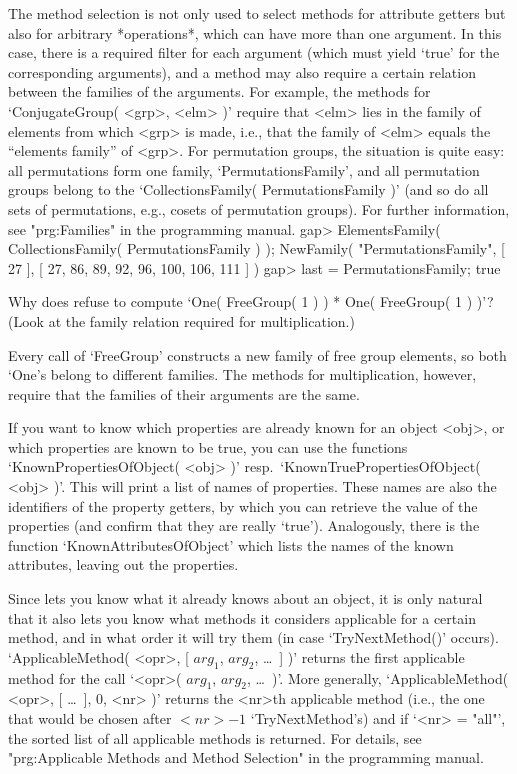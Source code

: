 %
The method selection  is not only  used to  select  methods for attribute
getters but also for arbitrary *operations*, which can have more than one
argument.  In this case,   there is a   required filter for each argument
(which must yield `true'  for the corresponding  arguments), and a method
may  also  require  a certain   relation   between the families  of   the
arguments. For example, the methods for  `ConjugateGroup( <grp>, <elm> )'
require that <elm>  lies in the family   of elements from  which <grp> is
made, i.e., that  the family of  <elm> equals the ``elements family''  of
<grp>.   For  permutation groups,  the  situation   is   quite easy:  all
permutations form  one family, `PermutationsFamily', and  all permutation
groups belong to the `CollectionsFamily( PermutationsFamily )' (and so do
all    sets of permutations, e.g.,     cosets of permutation groups). For
further information, see "prg:Families" in the programming manual.
\beginexample
    gap> ElementsFamily( CollectionsFamily( PermutationsFamily ) );
    NewFamily( "PermutationsFamily", [ 27 ],
               [ 27, 86, 89, 92, 96, 100, 106, 111 ] )
    gap> last = PermutationsFamily;
    true
\endexample

\exercise Why does {\GAP} refuse to compute `One( FreeGroup( 1 ) ) * One(
FreeGroup(  1   )   )'? (Look   at  the   family   relation  required for
multiplication.)

\answer Every call of  `FreeGroup' constructs a new  family of free group
elements, so both `One's belong   to different families. The methods  for
multiplication, however, require that the families of their arguments are
the same.

%
%
If  you want to know   which properties are   already known for an object
<obj>,  or  which properties  are  known  to  be true,   you can use  the
functions        `KnownPropertiesOfObject(     <obj>    )'         resp.\
`KnownTruePropertiesOfObject( <obj> )'. This will  print a list of  names
of  properties.  These names are  also   the identifiers  of the property
getters, by which  you can  retrieve  the value  of  the properties  (and
confirm that they are really `true').  Analogously, there is the function
`KnownAttributesOfObject' which lists the names  of the known attributes,
leaving out the properties.

%
Since {\GAP} lets you  know what it already  knows about an object, it is
only natural  that   it also  lets   you know what  methods  it considers
applicable for a certain method, and in  what order it  will try them (in
case `TryNextMethod()'  occurs).   `ApplicableMethod( <opr>, [   $arg_1$,
$arg_2$, \dots\ ]  )' returns the  first  applicable method for the  call
`<opr>( $arg_1$, $arg_2$,  \dots\ )'. More  generally, `ApplicableMethod(
<opr>, [ \dots\ ], 0, <nr> )' returns the <nr>th applicable method (i.e.,
the one  that would be  chosen  after  $<nr>-1$ `TryNextMethod's) and  if
`<nr>  = "all"', the sorted list  of  all applicable methods is returned.
For  details,  see "prg:Applicable Methods  and  Method Selection" in the
programming manual.

